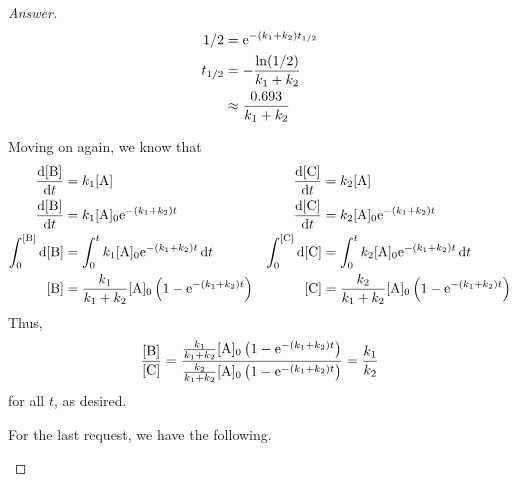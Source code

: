 \documentclass[../psets.tex]{subfiles}
\begin{document}
\begin{enumerate}[label={\textbf{28-\arabic*.}},leftmargin=3.5em]
\begin{proof}[Answer]
\begin{align*}
            1/2 &= \e[-(k_1+k_2)t_{1/2}]\\
            t_{1/2} &= -\frac{\ln(1/2)}{k_1+k_2}\\
            &\approx \frac{0.693}{k_1+k_2}
        \end{align*}\par
        Moving on again, we know that
        \begin{align*}
            \dv{[\ce{B}]}{t} &= k_1[\ce{A}]&
                \dv{[\ce{C}]}{t} &= k_2[\ce{A}]\\
            \dv{[\ce{B}]}{t} &= k_1[\ce{A}]_0\e[-(k_1+k_2)t]&
                \dv{[\ce{C}]}{t} &= k_2[\ce{A}]_0\e[-(k_1+k_2)t]\\
            \int_0^{[\ce{B}]}\dd{[\ce{B}]} &= \int_0^tk_1[\ce{A}]_0\e[-(k_1+k_2)t]\dd{t}&
                \int_0^{[\ce{C}]}\dd{[\ce{C}]} &= \int_0^tk_2[\ce{A}]_0\e[-(k_1+k_2)t]\dd{t}\\
            [\ce{B}] &= \frac{k_1}{k_1+k_2}[\ce{A}]_0\left( 1-\e[-(k_1+k_2)t] \right)&
                [\ce{C}] &= \frac{k_2}{k_1+k_2}[\ce{A}]_0\left( 1-\e[-(k_1+k_2)t] \right)
        \end{align*}
        Thus,
        \begin{equation*}
            \frac{[\ce{B}]}{[\ce{C}]} = \frac{\frac{k_1}{k_1+k_2}[\ce{A}]_0\left( 1-\e[-(k_1+k_2)t] \right)}{\frac{k_2}{k_1+k_2}[\ce{A}]_0\left( 1-\e[-(k_1+k_2)t] \right)}
            = \frac{k_1}{k_2}
        \end{equation*}
        for all $t$, as desired.\par
        For the last request, we have the following.
        \begin{center}
\end{center}
\end{proof}
\end{enumerate}
\end{document}
